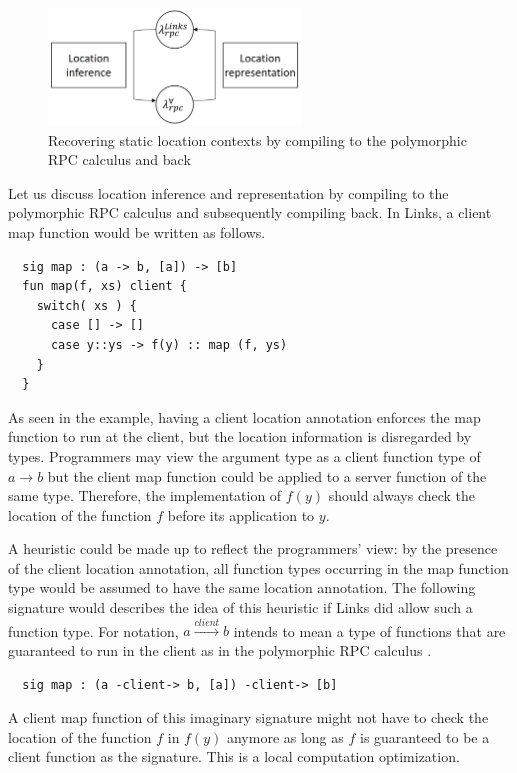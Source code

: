 \documentclass[a4paper]{article}
\theoremstyle{plain}
\theoremstyle{definition}
\newcommand{\funL}[1]{\xrightarrow{#1}}
\begin{document}
\begin{figure}[ht]
        \centering
        \includegraphics[width=0.6\textwidth]{linksrpc.png}
        \caption{Recovering static location contexts by compiling
          to the polymorphic RPC calculus and back}
        \label{fig:addingstaticlocationcontexts}
\end{figure}

%
Let us discuss location inference and representation by compiling to
the polymorphic RPC calculus and subsequently compiling back.
%
In Links, a client map function would be written as follows.
%

\begin{lstlisting}
  sig map : (a -> b, [a]) -> [b]
  fun map(f, xs) client {
    switch( xs ) {
      case [] -> []
      case y::ys -> f(y) :: map (f, ys)
    }
  }
\end{lstlisting}

%
As seen in the example, having a client location annotation enforces
the map function to run at the client, but the location information is
disregarded by types.
%
Programmers may view the argument type as a client function type of $a
\rightarrow b$ but the client map function could be applied to a
server function of the same type.
%
Therefore, the implementation of $f(y)$ should always check the
location of the function $f$ before its application to $y$.

%
A heuristic could be made up to reflect the programmers' view: by the
presence of the client location annotation, all function types
occurring in the map function type would be assumed to have the same
location annotation.
%
The following signature would describes the idea of this heuristic if
Links did allow such a function type.
%
For notation, $a \funL{client} b$ intends to mean a type of functions
that are guaranteed to run in the client as in the polymorphic RPC
calculus \cite{CHOI:scp2020}.

\begin{lstlisting}
  sig map : (a -client-> b, [a]) -client-> [b]
\end{lstlisting}

A client map function of this imaginary signature might not have to
check the location of the function $f$ in $f(y)$ anymore as long as $f$ is
guaranteed to be a client function as the signature. This is a local computation
optimization.
\end{document}
